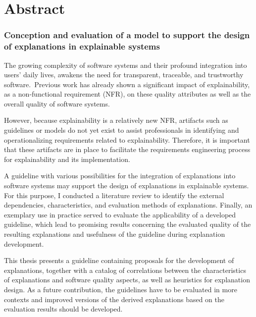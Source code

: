 \clearpage

\chapter*{Abstract}

\subsection*{Conception and evaluation of a model to support the design of explanations in explainable systems}

The growing complexity of software systems and their profound integration into users’ daily lives, awakens the need for transparent, traceable, and trustworthy software. Previous work  has already shown a significant impact of explainability, as a non-functional requirement (NFR), on these quality attributes as well as the overall quality of software systems.

However, because explainability is a relatively new NFR, artifacts such as guidelines or models do not yet exist to assist professionals in identifying and operationalizing requirements related to explainability. Therefore, it is important that these artifacts are in place to facilitate the requirements engineering process for explainability and its implementation.

A guideline with various possibilities for the integration of explanations into software systems may support the design of explanations in explainable systems. For this purpose, I conducted a literature review to identify the external dependencies, characteristics, and evaluation methods of explanations. Finally, an exemplary use in practice served to evaluate the applicability of a developed guideline, which lead to promising results concerning the evaluated quality of the resulting explanations and usefulness of the guideline during explanation development.

This thesis presents a guideline containing proposals for the development of explanations, together with a catalog of correlations between the characteristics of explanations and software quality aspects, as well as heuristics for explanation design. As a future contribution, the guidelines have to be evaluated in more contexts and improved versions of the derived explanations based on the evaluation results should be developed.

\clearpage